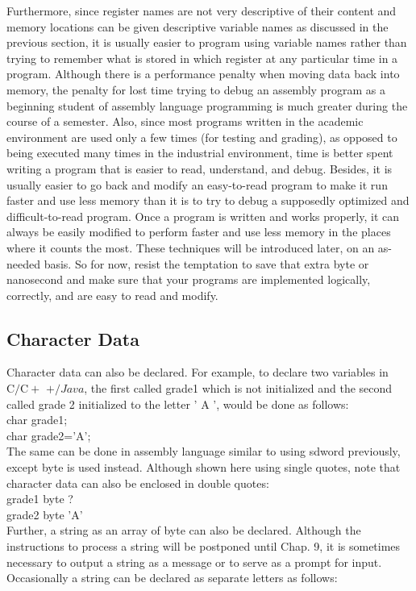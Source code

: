 \documentclass[10pt]{book}
\begin{document}
Furthermore, since register names are not very descriptive of their content and memory locations can be given descriptive variable names as discussed in the previous section, it is usually easier to program using variable names rather than trying to remember what is stored in which register at any particular time in a program. Although there is a performance penalty when moving data back into memory, the penalty for lost time trying to debug an assembly program as a beginning student of assembly language programming is much greater during the course of a semester. Also, since most programs written in the academic environment are used only a few times (for testing and grading), as opposed to being executed many times in the industrial environment, time is better spent writing a program that is easier to read, understand, and debug. Besides, it is usually easier to go back and modify an easy-to-read program to make it run faster and use less memory than it is to try to debug a supposedly optimized and difficult-to-read program. Once a program is written and works properly, it can always be easily modified to perform faster and use less memory in the places where it counts the most. These techniques will be introduced later, on an as-needed basis. So for now, resist the temptation to save that extra byte or nanosecond and make sure that your programs are implemented logically, correctly, and are easy to read and modify.

\subsection{Character Data}
Character data can also be declared. For example, to declare two variables in $\mathrm{C} / \mathrm{C}+$ $+/ J a v a$, the first called grade1 which is not initialized and the second called grade 2 initialized to the letter ' A ', would be done as follows:\\
char grade1;\\
char grade2='A';\\
The same can be done in assembly language similar to using sdword previously, except byte is used instead. Although shown here using single quotes, note that character data can also be enclosed in double quotes:\\
grade1 byte ?\\
grade2 byte 'A'\\

Further, a string as an array of byte can also be declared. Although the instructions to process a string will be postponed until Chap. 9, it is sometimes necessary to output a string as a message or to serve as a prompt for input. Occasionally a string can be declared as separate letters as follows:
\end{document}
